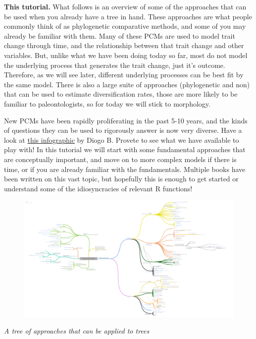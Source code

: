 \documentclass[]{article}
\begin{document}
\textbf{This tutorial.} What follows is an overview of some of the
approaches that can be used when you already have a tree in hand. These
approaches are what people commonly think of as phylogenetic comparative
methods, and some of you may already be familiar with them. Many of
these PCMs are used to model trait change through time, and the
relationship between that trait change and other variables. But, unlike
what we have been doing today so far, most do not model the underlying
process that generates the trait change, just it's outcome. Therefore,
as we will see later, different underlying processes can be best fit by
the same model. There is also a large suite of approaches (phylogenetic
and non) that can be used to estimate diversification rates, those are
more likely to be familiar to paleontologists, so for today we will
stick to morphology.

New PCMs have been rapidly proliferating in the past 5-10 years, and the
kinds of questions they can be used to rigorously answer is now very
diverse. Have a look at
\href{https://coggle.it/diagram/WhbkkxE2BAAB0R0m/t/summary-of-phylogenetic-comparative-methods-diogo-b-provete}{this
infographic} by Diogo B. Provete to see what we have available to play
with! In this tutorial we will start with some fundamental approaches
that are conceptually important, and move on to more complex models if
there is time, or if you are already familiar with the fundamentals.
Multiple books have been written on this vast topic, but hopefully this
is enough to get started or understand some of the idiosyncracies of
relevant R functions!

\begin{figure}
\centering
\includegraphics{Summary_of_PCMs.png}
\caption{}
\end{figure}

\emph{A tree of approaches that can be applied to trees}
\end{document}
